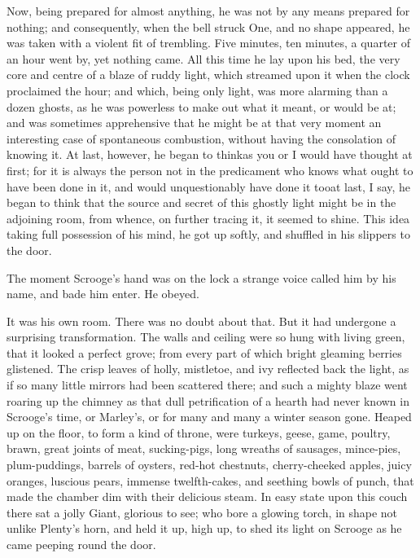 \documentclass[paper=5.5in:8.5in,BCOR=5mm,twoside,DIV=calc,12pt,usegeometry]{scrbook} %
\begin{document}
Now, being prepared for almost anything, he was not by any means prepared for nothing; and consequently, when the bell struck One, and no shape appeared, he was taken with a violent fit of trembling. Five minutes, ten minutes, a quarter of an hour went by, yet nothing came. All this time he lay upon his bed, the very core and centre of a blaze of ruddy light, which streamed upon it when the clock proclaimed the hour; and which, being only light, was more alarming than a dozen ghosts, as he was powerless to make out what it meant, or would be at; and was sometimes apprehensive that he might be at that very moment an interesting case of spontaneous combustion, without having the consolation of knowing it. At last, however, he began to think\textemdash as you or I would have thought at first; for it is always the person not in the predicament who knows what ought to have been done in it, and would unquestionably have done it too\textemdash at last, I say, he began to think that the source and secret of this ghostly light might be in the adjoining room, from whence, on further tracing it, it seemed to shine. This idea taking full possession of his mind, he got up softly, and shuffled in his slippers to the door.

The moment Scrooge's hand was on the lock a strange voice called him by his name, and bade him enter. He obeyed.

It was his own room. There was no doubt about that. But it had undergone a surprising transformation. The walls and ceiling were so hung with living green, that it looked a perfect grove; from every part of which bright gleaming berries glistened. The crisp leaves of holly, mistletoe, and ivy reflected back the light, as if so many little mirrors had been scattered there; and such a mighty blaze went roaring up the chimney as that dull petrification of a hearth had never known in Scrooge's time, or Marley's, or for many and many a winter season gone. Heaped up on the floor, to form a kind of throne, were turkeys, geese, game, poultry, brawn, great joints of meat, sucking-pigs, long wreaths of sausages, mince-pies, plum-puddings, barrels of oysters, red-hot chestnuts, cherry-cheeked apples, juicy oranges, luscious pears, immense twelfth-cakes, and seething bowls of punch, that made the chamber dim with their delicious steam. In easy state upon this couch there sat a jolly Giant, glorious to see; who bore a glowing torch, in shape not unlike Plenty's horn, and held it up, high up, to shed its light on Scrooge as he came peeping round the door.
\end{document}
